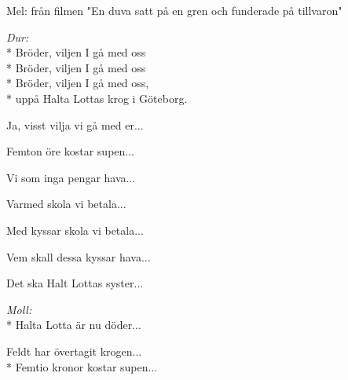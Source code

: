 \begin{SongText}
    \begin{SongInfo}
        Mel: från filmen "En duva satt på en gren och funderade på tillvaron"
    \end{SongInfo}
    \begin{SongVerse}
        \textit{Dur:}\\*%
        Bröder, viljen I gå med oss\\*%
        Bröder, viljen I gå med oss\\*%
        Bröder, viljen I gå med oss,\\*%
        uppå Halta Lottas krog i Göteborg.
    \end{SongVerse}
    \begin{SongVerse}
        Ja, visst vilja vi gå med er...
    \end{SongVerse}
    \begin{SongVerse}
        Femton öre kostar supen...
    \end{SongVerse}
    \begin{SongVerse}
        Vi som inga pengar hava...
    \end{SongVerse}
    \begin{SongVerse}
        Varmed skola vi betala...
    \end{SongVerse}
    \begin{SongVerse}
        Med kyssar skola vi betala...
    \end{SongVerse}
    \begin{SongVerse}
        Vem skall dessa kyssar hava...
    \end{SongVerse}
    \begin{SongVerse}
        Det ska Halt Lottas syster...
    \end{SongVerse}
    \begin{SongVerse}
        \textit{Moll:}  \\*%
        Halta Lotta är nu döder...
    \end{SongVerse}
    \begin{SongVerse}
        Feldt har övertagit krogen...\\*%
        Femtio kronor kostar supen...
    \end{SongVerse}
\end{SongText}
